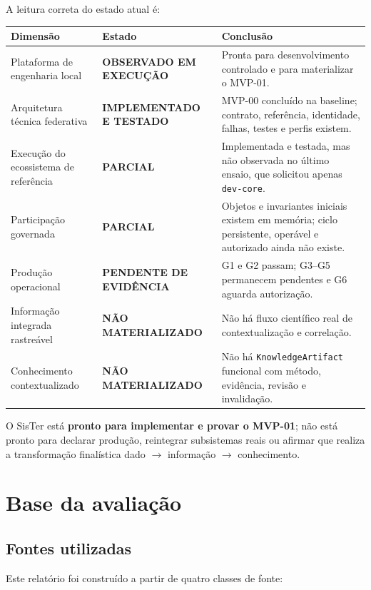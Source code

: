 \documentclass[11pt,a4paper,oneside]{article}
\newcommand{\statusobservado}{\textcolor{sistergreen}{\textbf{OBSERVADO EM EXECUÇÃO}}}
\newcommand{\statustestado}{\textcolor{sisterblue}{\textbf{IMPLEMENTADO E TESTADO}}}
\newcommand{\statusparcial}{\textcolor{sisteramber}{\textbf{PARCIAL}}}
\newcommand{\statusausente}{\textcolor{sisterred}{\textbf{NÃO MATERIALIZADO}}}
\newcommand{\statuspendente}{\textcolor{sisteramber}{\textbf{PENDENTE DE EVIDÊNCIA}}}
\begin{document}
A leitura correta do estado atual é:

\begin{tabularx}{\textwidth}{P{4.3cm}P{3.3cm}Y}
\toprule
\textbf{Dimensão} & \textbf{Estado} & \textbf{Conclusão} \\
\midrule
Plataforma de engenharia local & \statusobservado & Pronta para desenvolvimento controlado e para materializar o MVP-01. \\
Arquitetura técnica federativa & \statustestado & MVP-00 concluído na baseline; contrato, referência, identidade, falhas, testes e perfis existem. \\
Execução do ecossistema de referência & \statusparcial & Implementada e testada, mas não observada no último ensaio, que solicitou apenas \texttt{dev-core}. \\
Participação governada & \statusparcial & Objetos e invariantes iniciais existem em memória; ciclo persistente, operável e autorizado ainda não existe. \\
Produção operacional & \statuspendente & G1 e G2 passam; G3--G5 permanecem pendentes e G6 aguarda autorização. \\
Informação integrada rastreável & \statusausente & Não há fluxo científico real de contextualização e correlação. \\
Conhecimento contextualizado & \statusausente & Não há \texttt{KnowledgeArtifact} funcional com método, evidência, revisão e invalidação. \\
\bottomrule
\end{tabularx}

\begin{decisao}
O SisTer está \textbf{pronto para implementar e provar o MVP-01}; não está pronto para declarar produção, reintegrar subsistemas reais ou afirmar que realiza a transformação finalística dado $\rightarrow$ informação $\rightarrow$ conhecimento.
\end{decisao}

\section{Base da avaliação}

\subsection{Fontes utilizadas}

Este relatório foi construído a partir de quatro classes de fonte:
\end{document}
